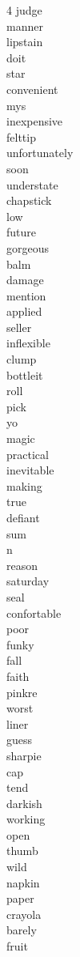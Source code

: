 \begin{multicols}{4}
	judge\\ manner\\ lipstain\\ doit\\ star\\ convenient\\ mys\\ inexpensive\\
	felttip\\ unfortunately\\ soon\\ understate\\ chapstick\\ low\\ future\\ gorgeous\\
	balm\\ damage\\ mention\\ applied\\ seller\\ inflexible\\ clump\\ bottleit\\
	roll\\ pick\\ yo\\ magic\\ practical\\ inevitable\\ making\\ true\\ defiant\\ sum\\
	n\\ reason\\ saturday\\ seal\\ confortable\\ poor\\ funky\\ fall\\ faith\\ pinkre\\
	worst\\ liner\\ guess\\ sharpie\\ cap\\ tend\\ darkish\\ working\\ open\\ thumb\\
	wild\\ napkin\\ paper\\ crayola\\ barely\\ fruit\\
\end{multicols}


